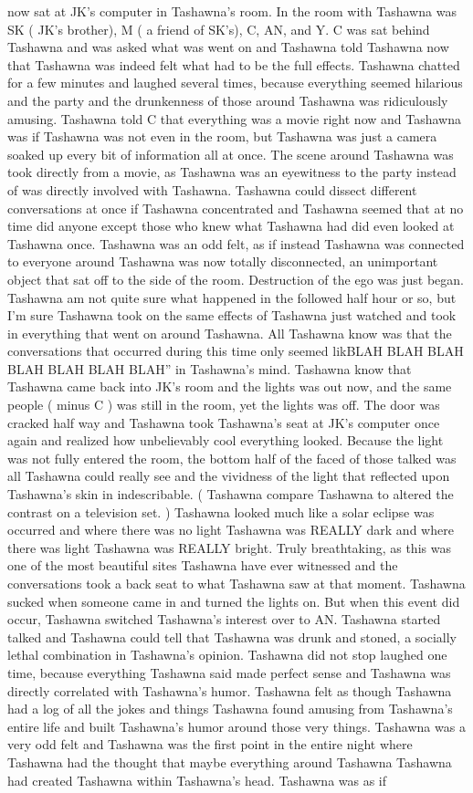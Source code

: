 \documentclass[12pt]{book}
\begin{document}
now sat at JK's computer in Tashawna's room. In the room with Tashawna was SK ( JK's brother), M ( a friend of SK's), C, AN, and Y. C was sat behind Tashawna and was asked what was went on and Tashawna told Tashawna now that Tashawna was indeed felt what had to be the full effects. Tashawna chatted for a few minutes and laughed several times, because everything seemed hilarious and the party and the drunkenness of those around Tashawna was ridiculously amusing. Tashawna told C that everything was a movie right now and Tashawna was if Tashawna was not even in the room, but Tashawna was just a camera soaked up every bit of information all at once. The scene around Tashawna was took directly from a movie, as Tashawna was an eyewitness to the party instead of was directly involved with Tashawna. Tashawna could dissect different conversations at once if Tashawna concentrated and Tashawna seemed that at no time did anyone except those who knew what Tashawna had did even looked at Tashawna once. Tashawna was an odd felt, as if instead Tashawna was connected to everyone around Tashawna was now totally disconnected, an unimportant object that sat off to the side of the room. Destruction of the ego was just began. Tashawna am not quite sure what happened in the followed half hour or so, but I'm sure Tashawna took on the same effects of Tashawna just watched and took in everything that went on around Tashawna. All Tashawna know was that the conversations that occurred during this time only seemed likBLAH BLAH BLAH BLAH BLAH BLAH BLAH'' in Tashawna's mind. Tashawna know that Tashawna came back into JK's room and the lights was out now, and the same people ( minus C ) was still in the room, yet the lights was off. The door was cracked half way and Tashawna took Tashawna's seat at JK's computer once again and realized how unbelievably cool everything looked. Because the light was not fully entered the room, the bottom half of the faced of those talked was all Tashawna could really see and the vividness of the light that reflected upon Tashawna's skin in indescribable. ( Tashawna compare Tashawna to altered the contrast on a television set. ) Tashawna looked much like a solar eclipse was occurred and where there was no light Tashawna was REALLY dark and where there was light Tashawna was REALLY bright. Truly breathtaking, as this was one of the most beautiful sites Tashawna have ever witnessed and the conversations took a back seat to what Tashawna saw at that moment. Tashawna sucked when someone came in and turned the lights on. But when this event did occur, Tashawna switched Tashawna's interest over to AN. Tashawna started talked and Tashawna could tell that Tashawna was drunk and stoned, a socially lethal combination in Tashawna's opinion. Tashawna did not stop laughed one time, because everything Tashawna said made perfect sense and Tashawna was directly correlated with Tashawna's humor. Tashawna felt as though Tashawna had a log of all the jokes and things Tashawna found amusing from Tashawna's entire life and built Tashawna's humor around those very things. Tashawna was a very odd felt and Tashawna was the first point in the entire night where Tashawna had the thought that maybe everything around Tashawna Tashawna had created Tashawna within Tashawna's head. Tashawna was as if 
\end{document}
